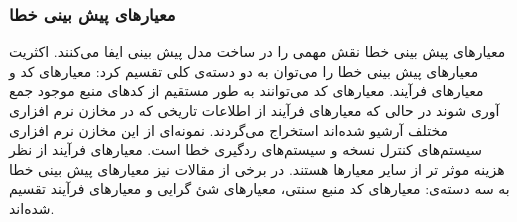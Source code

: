 \subsubsection{معیارهای پیش بینی خطا}

معیارهای پیش بینی خطا نقش مهمی را در ساخت مدل پیش بینی ایفا می‌کنند. اکثریت معیارهای پیش بینی خطا را می‌توان به دو دسته‌ی  کلی تقسیم کرد: معیارهای کد و معیارهای فرآیند. معیارهای کد می‌توانند به طور مستقیم از کدهای منبع موجود جمع آوری شوند در حالی که معیارهای فرآیند  از اطلاعات تاریخی که در مخازن نرم افزاری مختلف آرشیو شده‌اند استخراج می‌گردند. نمونه‌ای از این مخازن نرم افزاری سیستم‌های کنترل نسخه و سیستم‌های ردگیری خطا است. معیار‌های فرآیند از نظر هزینه موثر تر از سایر معیارها هستند\cite{arisholm2010systematic}. در برخی از مقالات نیز معیارهای  پیش بینی خطا به سه دسته‌ی: معیارهای کد منبع سنتی، معیارهای شئ گرایی و معیارهای فرآیند تقسیم شده‌اند\cite{radjenovic2013software}.\\

